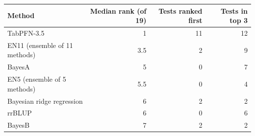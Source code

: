 \begin{tabular}{lrrr}
\toprule
Method & Median rank (of 19) & Tests ranked first & Tests in top 3 \\
\midrule
TabPFN-3.5 & 1 & 11 & 12 \\
EN11 (ensemble of 11 methods) & 3.5 & 2 & 9 \\
BayesA & 5 & 0 & 7 \\
EN5 (ensemble of 5 methods) & 5.5 & 0 & 4 \\
Bayesian ridge regression & 6 & 2 & 2 \\
rrBLUP & 6 & 0 & 6 \\
BayesB & 7 & 2 & 2 \\
\bottomrule
\end{tabular}

